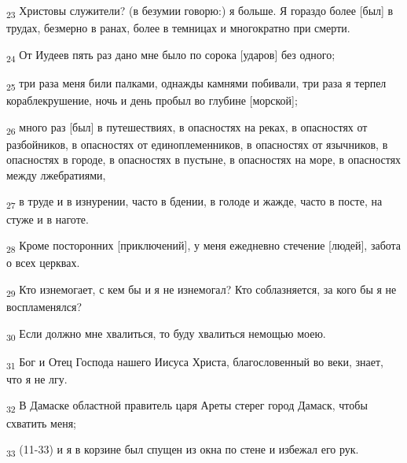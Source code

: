 \begin{tcolorbox}
\textsubscript{23} Христовы служители? (в безумии говорю:) я больше. Я гораздо более [был] в трудах, безмерно в ранах, более в темницах и многократно при смерти.
\end{tcolorbox}
\begin{tcolorbox}
\textsubscript{24} От Иудеев пять раз дано мне было по сорока [ударов] без одного;
\end{tcolorbox}
\begin{tcolorbox}
\textsubscript{25} три раза меня били палками, однажды камнями побивали, три раза я терпел кораблекрушение, ночь и день пробыл во глубине [морской];
\end{tcolorbox}
\begin{tcolorbox}
\textsubscript{26} много раз [был] в путешествиях, в опасностях на реках, в опасностях от разбойников, в опасностях от единоплеменников, в опасностях от язычников, в опасностях в городе, в опасностях в пустыне, в опасностях на море, в опасностях между лжебратиями,
\end{tcolorbox}
\begin{tcolorbox}
\textsubscript{27} в труде и в изнурении, часто в бдении, в голоде и жажде, часто в посте, на стуже и в наготе.
\end{tcolorbox}
\begin{tcolorbox}
\textsubscript{28} Кроме посторонних [приключений], у меня ежедневно стечение [людей], забота о всех церквах.
\end{tcolorbox}
\begin{tcolorbox}
\textsubscript{29} Кто изнемогает, с кем бы и я не изнемогал? Кто соблазняется, за кого бы я не воспламенялся?
\end{tcolorbox}
\begin{tcolorbox}
\textsubscript{30} Если должно мне хвалиться, то буду хвалиться немощью моею.
\end{tcolorbox}
\begin{tcolorbox}
\textsubscript{31} Бог и Отец Господа нашего Иисуса Христа, благословенный во веки, знает, что я не лгу.
\end{tcolorbox}
\begin{tcolorbox}
\textsubscript{32} В Дамаске областной правитель царя Ареты стерег город Дамаск, чтобы схватить меня;
\end{tcolorbox}
\begin{tcolorbox}
\textsubscript{33} (11-33) и я в корзине был спущен из окна по стене и избежал его рук.
\end{tcolorbox}
